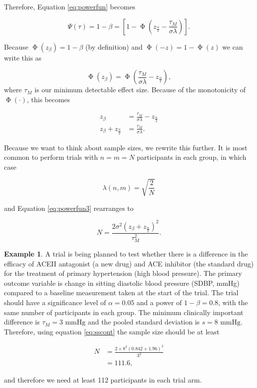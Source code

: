 \documentclass[
  openany]{book}
\theoremstyle{definition}
\theoremstyle{definition}
\newtheorem{example}{Example}[chapter]
\theoremstyle{definition}
\theoremstyle{definition}
\theoremstyle{remark}
\begin{document}
Therefore, Equation \eqref{eq:powerfun} becomes

\begin{equation}
\Psi\left(\tau\right) = 1-\beta = \left[1 - \operatorname{\Phi}\left(z_{\frac{\alpha}{2}} - \frac{\tau_M}{\sigma\lambda}\right)\right].
\label{eq:powerfun2}
\end{equation}

Because \(\operatorname{\Phi}\left(z_\beta\right) = 1 - \beta\) (by definition) and \(\operatorname{\Phi}\left(-z\right) = 1 - \operatorname{\Phi}\left(z\right)\) we can write this as

\[ \operatorname{\Phi}\left(z_\beta\right) = \operatorname{\Phi}\left(\frac{\tau_M}{\sigma\lambda} - z_{\frac{\alpha}{2}}\right), \]
where \(\tau_M\) is our minimum detectable effect size. Because of the monotonicity of \(\operatorname{\Phi}\left(\cdot\right)\), this becomes

\begin{equation}
\begin{aligned}
  z_\beta & = \frac{\tau_M}{\sigma\lambda} - z_{\frac{\alpha}{2}} \\
  z_\beta + z_{\frac{\alpha}{2}} & = \frac{\tau_M}{\sigma\lambda}.
\end{aligned}
\label{eq:powerfun3}
\end{equation}

Because we want to think about sample sizes, we rewrite this further. It is most common to perform trials with \(n=m=N\) participants in each group, in which case

\[ \lambda\left(n,m\right) = \sqrt{\frac{2}{N}}\]

and Equation \eqref{eq:powerfun3} rearranges to

\begin{equation}
    N = \frac{2\sigma^2\left(z_\beta + z_{\frac{\alpha}{2}}\right)^2}{\tau_M^2}.
    \label{eq:sscont}
\end{equation}

\begin{example}
\protect\hypertarget{exm:sseg1}{}\label{exm:sseg1}\citep[from][]{zhong2009calculate}
A trial is being planned to test whether there is a difference in the efficacy of ACEII antagonist (a new drug) and ACE inhibitor (the standard drug) for the treatment of primary hypertension (high blood pressure). The primary outcome variable is change in sitting diastolic blood pressure (SDBP, mmHg) compared to a baseline measurement taken at the start of the trial. The trial should have a significance level of \(\alpha=0.05\) and a power of \(1-\beta = 0.8\), with the same number of participants in each group. The minimum clinically important difference is \(\tau_M = 3 \text{ mmHg}\) and the pooled standard deviation is \(s = 8 \text{ mmHg}\). Therefore, using equation \eqref{eq:sscont} the sample size should be at least

\begin{align*}
      N & = \frac{2\times{8}^2\left(0.842 + 1.96\right)^2}{3^2}\\
      & = 111.6,
\end{align*}

and therefore we need at least 112 participants in each trial arm.
\end{example}
\end{document}
